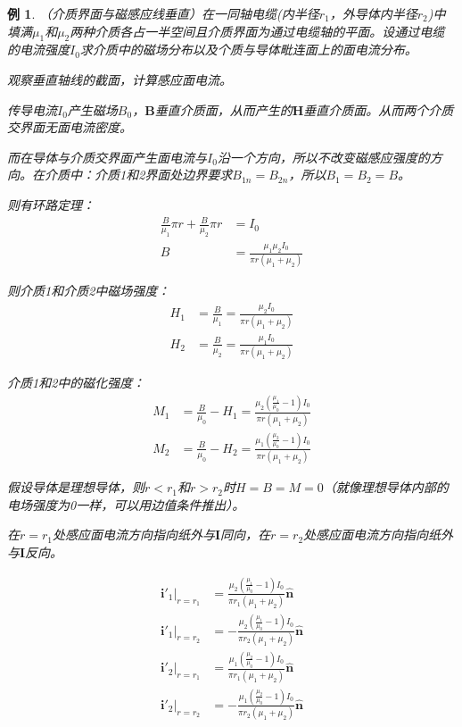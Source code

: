 \documentclass[12pt,onecolumn,a4paper]{book}
\newtheorem*{example}{例}
\numberwithin{table}{subsection}
\numberwithin{equation}{subsection}
\begin{document}
    \begin{example}
        （介质界面与磁感应线垂直）在一同轴电缆(内半径$r_1$，外导体内半径$r_2$)中填满$\mu_1$和$\mu_2$两种介质各占一半空间且介质界面为通过电缆轴的平面。设通过电缆的电流强度$I_0$求介质中的磁场分布以及个质与导体毗连面上的面电流分布。

        观察垂直轴线的截面，计算感应面电流。

        传导电流$I_0$产生磁场$B_0$，$\mathbf{B}$垂直介质面，从而产生的$\mathbf{H}$垂直介质面。从而两个介质交界面无面电流密度。

        而在导体与介质交界面产生面电流与$I_0$沿一个方向，所以不改变磁感应强度的方向。在介质中：介质1和2界面处边界要求$B_{1n} = B_{2n}$，所以$B_1 = B_2=B$。

        则有环路定理：
        \begin{align}
            \frac{B}{\mu_1} \pi r + \frac{B}{\mu_2} \pi r & = I_0                                        \\
            B                                             & = \frac{\mu_1\mu_2 I_0}{\pi r (\mu_1+\mu_2)}
        \end{align}

        则介质1和介质2中磁场强度：
        \begin{align}
            H_1 & = \frac{B}{\mu_1} = \frac{\mu_2 I_0}{\pi r (\mu_1+\mu_2)} \\
            H_2 & = \frac{B}{\mu_2} = \frac{\mu_1 I_0}{\pi r (\mu_1+\mu_2)}
        \end{align}

        介质1和2中的磁化强度：
        \begin{align}
            M_1 & = \frac{B}{\mu_0} - H_1 = \frac{\mu_2 (\frac{\mu_1}{\mu_0}-1)I_0}{\pi r (\mu_1+\mu_2)} \\
            M_2 & = \frac{B}{\mu_0} - H_2 = \frac{\mu_1 (\frac{\mu_2}{\mu_0}-1)I_0}{\pi r (\mu_1+\mu_2)}
        \end{align}

        假设导体是理想导体，则$r<r_1$和$r>r_2$时$H=B=M=0$（就像理想导体内部的电场强度为0一样，可以用边值条件推出）。

        在$r=r_1$处感应面电流方向指向纸外与$\mathbf{I}$同向，在$r=r_2$处感应面电流方向指向纸外与$\mathbf{I}$反向。

        \begin{align}
            \mathbf{i'}_1|_{r=r_1} & = \frac{\mu_2 (\frac{\mu_1}{\mu_0}-1)I_0}{\pi r_1 (\mu_1+\mu_2)} \hat{\mathbf{n}}  \\
            \mathbf{i'}_1|_{r=r_2} & = -\frac{\mu_2 (\frac{\mu_1}{\mu_0}-1)I_0}{\pi r_2 (\mu_1+\mu_2)} \hat{\mathbf{n}} \\
            \mathbf{i'}_2|_{r=r_1} & = \frac{\mu_1 (\frac{\mu_2}{\mu_0}-1)I_0}{\pi r_1 (\mu_1+\mu_2)} \hat{\mathbf{n}}  \\
            \mathbf{i'}_2|_{r=r_2} & = -\frac{\mu_1 (\frac{\mu_2}{\mu_0}-1)I_0}{\pi r_2 (\mu_1+\mu_2)} \hat{\mathbf{n}}
        \end{align}


\end{example}
\end{document}
